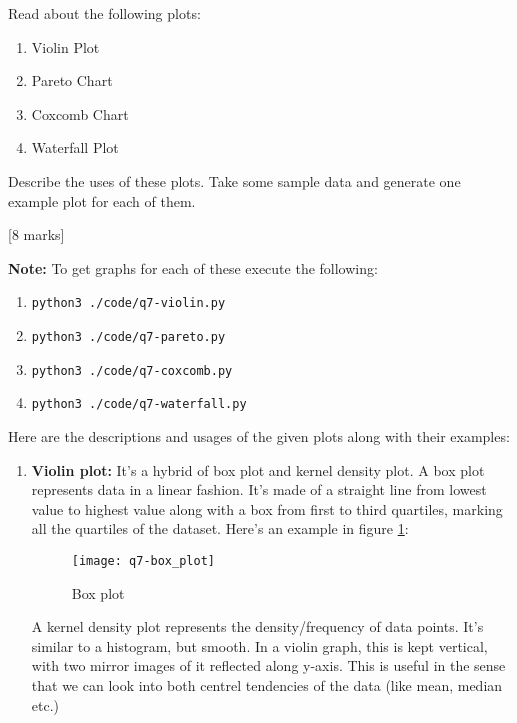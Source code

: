 \begin{que}
	Read about the following plots:
	\begin{enumerate}
		\item Violin Plot
		\item Pareto Chart
		\item Coxcomb Chart
		\item Waterfall Plot
	\end{enumerate}
	Describe the uses of these plots. Take some sample data and generate
	one example plot for each of them.

	\hspace*{\fill} [8 marks]
\end{que}

\begin{tcolorbox}[breakable]
	\begin{sol}
		\textbf{Note: } To get graphs for each of these execute the following:
		\begin{enumerate}
			\item \texttt{python3 ./code/q7-violin.py}
			\item \texttt{python3 ./code/q7-pareto.py}
			\item \texttt{python3 ./code/q7-coxcomb.py}
			\item \texttt{python3 ./code/q7-waterfall.py}
		\end{enumerate}
		Here are the descriptions and usages of the given plots along
		with their examples:
		\begin{enumerate}
			\item \textbf{Violin plot:} It's a hybrid of box plot
			      and kernel density plot. A box plot represents
			      data in a linear fashion. It's made of a straight
			      line from lowest value to highest value along
			      with a box from first to third quartiles, marking
			      all the quartiles of the dataset. Here's an
			      example in figure \ref{fig:box}:
			      \begin{figure}[H]
				      \centering
				      \texttt{[image: q7-box\_plot]}
				      \caption{Box plot}
				      \label{fig:box}
			      \end{figure}
			      A kernel density plot represents the
			      density/frequency of data points. It's similar to
			      a histogram, but smooth. In a violin graph, this
			      is kept vertical, with two mirror images of it
			      reflected along y-axis. This is useful in the
			      sense that we can look into both centrel
			      tendencies of the data (like mean, median etc.)

\end{enumerate}
\end{sol}
\end{tcolorbox}
